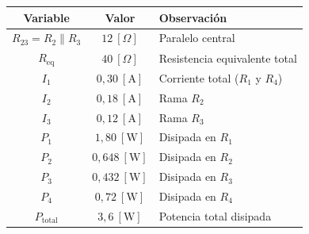 \documentclass[12pt,letterpaper]{article}
\begin{document}
\begin{center}
\begin{tabular}{|c|c|l|}
\hline
\textbf{Variable} & \textbf{Valor} & \textbf{Observaci\'on} \\
\hline
$R_{23} = R_2 \parallel R_3$ & $12\ [\Omega]$ & Paralelo central \\
$R_{\text{eq}}$ & $40\ [\Omega]$ & Resistencia equivalente total \\
$I_1$ & $0{,}30\ [\text{A}]$ & Corriente total ($R_1$ y $R_4$) \\
$I_2$ & $0{,}18\ [\text{A}]$ & Rama $R_2$ \\
$I_3$ & $0{,}12\ [\text{A}]$ & Rama $R_3$ \\
$P_1$ & $1{,}80\ [\text{W}]$ & Disipada en $R_1$ \\
$P_2$ & $0{,}648\ [\text{W}]$ & Disipada en $R_2$ \\
$P_3$ & $0{,}432\ [\text{W}]$ & Disipada en $R_3$ \\
$P_4$ & $0{,}72\ [\text{W}]$ & Disipada en $R_4$ \\
$P_{\text{total}}$ & $3{,}6\ [\text{W}]$ & Potencia total disipada \\
\hline
\end{tabular}
\end{center}
\end{document}
